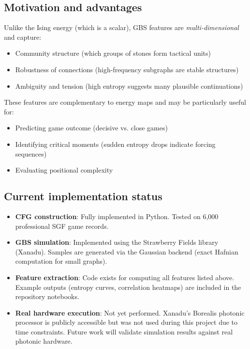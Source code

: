 \documentclass[aps,prl,reprint]{revtex4-2}
\begin{document}
\subsection{Motivation and advantages}

Unlike the Ising energy (which is a scalar), GBS features are \textit{multi-dimensional} and capture:
\begin{itemize}
	\item Community structure (which groups of stones form tactical units)
	\item Robustness of connections (high-frequency subgraphs are stable structures)
	\item Ambiguity and tension (high entropy suggests many plausible continuations)
\end{itemize}

These features are complementary to energy maps and may be particularly useful for:
\begin{itemize}
	\item Predicting game outcome (decisive vs. close games)
	\item Identifying critical moments (sudden entropy drops indicate forcing sequences)
	\item Evaluating positional complexity
\end{itemize}

\subsection{Current implementation status}

\begin{itemize}
	\item \textbf{CFG construction}: Fully implemented in Python. Tested on 6,000 professional SGF game records.
	\item \textbf{GBS simulation}: Implemented using the Strawberry Fields library (Xanadu). Samples are generated via the Gaussian backend (exact Hafnian computation for small graphs).
	\item \textbf{Feature extraction}: Code exists for computing all features listed above. Example outputs (entropy curves, correlation heatmaps) are included in the repository notebooks.
	\item \textbf{Real hardware execution}: Not yet performed. Xanadu's Borealis photonic processor is publicly accessible but was not used during this project due to time constraints. Future work will validate simulation results against real photonic hardware.
\end{itemize}
\end{document}
